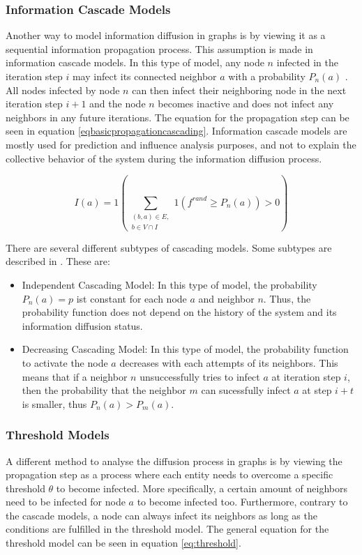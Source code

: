 \subsubsection{Information Cascade Models}

Another way to model information diffusion in graphs is by viewing it as a 
sequential information propagation process. This assumption is made in
information cascade models. In this type of model, any node $n$ infected in the
iteration step $i$ may infect its connected neighbor $a$ with a probability $P_n(a)$
\cite{reviewinformationdiffusion}. All nodes infected by node $n$
can then infect their neighboring node in the next iteration step $i+1$
and the node $n$ becomes inactive and does not infect any neighbors in any future
iterations.
The equation for the propagation step can be seen in equation 
\ref{eqbasicpropagationcascading}.
Information cascade models are mostly used for prediction and influence 
analysis purposes, and not to explain the collective behavior
of the system during the information diffusion process.

\begin{equation}
    I(a) = 1 (\sum\limits_{\substack{(b,a)\in E, \\ b \in V \cap I}}
    1(f^{rand}\geq P_n(a))>0) 
    \label{eqbasicpropagationcascading}
\end{equation}

There are several different subtypes of cascading models.
Some subtypes are described in \cite{diffusionbasics}. These are:

\begin{itemize}
    \item Independent Cascading Model: In this type of model, the 
    probability $P_n(a)=p$ ist constant for each node $a$ and neighbor $n$.
    Thus, the probability function does not depend on the history 
    of the system and its information diffusion status.
    \item Decreasing Cascading Model: In this type of model, the probability
    function to activate the node $a$ decreases with each attempts of its 
    neighbors. This means that if a neighbor $n$ unsuccessfully tries to infect
    $a$ at iteration step $i$, then the probability that the neighbor $m$
    can sucessfully infect $a$ at step $i+t$ is smaller, thus $P_n(a)>P_m(a)$.
\end{itemize}

\subsubsection{Threshold Models}
A different method to analyse the diffusion process in graphs is by viewing the
propagation step as a process where each entity needs to overcome a 
specific threshold $\theta$ to become infected. More specifically, 
a certain amount of neighbors need to be infected for node $a$ to become 
infected too. Furthermore, contrary to the cascade models, a node can always 
infect its neighbors as long as the conditions are fulfilled in the threshold 
model. The general equation for the threshold model can be seen in equation
\ref{eq:threshold}.

